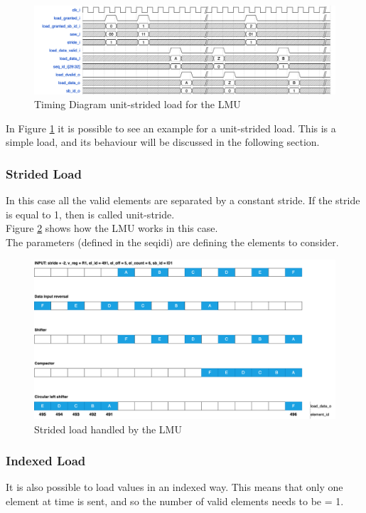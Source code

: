 \begin{figure}[H]
    \centering
    \includegraphics[scale = 0.35]{Chapter_2/img/lmu-time.png}
    \caption{Timing Diagram unit-strided load for the LMU}
    \label{lmu-time}
\end{figure}

In Figure \ref{lmu-time} it is possible to see an example for a unit-strided load. This is a simple load, and its behaviour will be discussed in the following section.

\subsubsection{Strided Load}
In this case all the valid elements are separated by a constant stride. If the stride is equal to 1, then is called unit-stride.\\

Figure \ref{lmu-strided} shows how the LMU works in this case.\\
The parameters (defined in the seq\+id\+i) are defining the elements to consider.
\begin{figure}[H]
    \centering
    \includegraphics[scale = 0.25]{Chapter_2/img/lmu-strided.png}
    \caption{Strided load handled by the LMU}
    \label{lmu-strided}
\end{figure}

\subsubsection{Indexed Load}
It is also possible to load values in an indexed way. This means that only one element at time is sent, and so the number of valid elements needs to be = 1.\\

